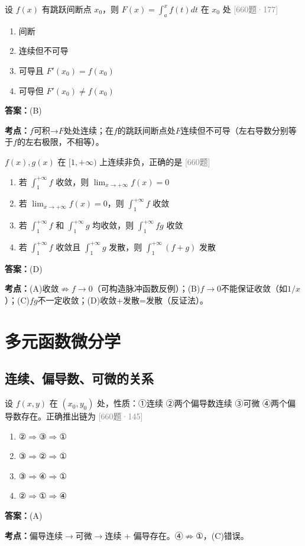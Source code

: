\documentclass[12pt,a4paper]{ctexbook}
\newcommand{\src}[1]{\hfill\textcolor{gray}{\small\textsf{[#1]}}}
\newcommand{\ans}[1]{\begin{answerbox}\textbf{答案：}#1\end{answerbox}}
\newcommand{\kpt}[1]{\textbf{考点：}#1}
\begin{document}
\bigskip

\begin{exercise}[660题·变上限积分性质·177]
设 $f(x)$ 有跳跃间断点 $x_0$，则 $F(x)=\int_a^x f(t)dt$ 在 $x_0$ 处 \hfill\src{660题·177}
\begin{enumerate}[label=(\Alph*),nosep]
  \item 间断
  \item 连续但不可导
  \item 可导且 $F'(x_0)=f(x_0)$
  \item 可导但 $F'(x_0)\neq f(x_0)$
\end{enumerate}
\end{exercise}
\ans{(B)}
\kpt{$f$可积→$F$处处连续；在$f$的跳跃间断点处$F$连续但不可导（左右导数分别等于$f$的左右极限，不相等）。}

\bigskip

\begin{exercise}[660题·反常积分敛散性命题]
$f(x),g(x)$ 在 $[1,+\infty)$ 上连续非负，正确的是 \hfill\src{660题}
\begin{enumerate}[label=(\Alph*),nosep]
  \item 若 $\int_1^{+\infty}f$ 收敛，则 $\lim_{x\to+\infty}f(x)=0$
  \item 若 $\lim_{x\to+\infty}f(x)=0$，则 $\int_1^{+\infty}f$ 收敛
  \item 若 $\int_1^{+\infty}f$ 和 $\int_1^{+\infty}g$ 均收敛，则 $\int_1^{+\infty}fg$ 收敛
  \item 若 $\int_1^{+\infty}f$ 收敛且 $\int_1^{+\infty}g$ 发散，则 $\int_1^{+\infty}(f+g)$ 发散
\end{enumerate}
\end{exercise}
\ans{(D)}
\kpt{(A)收敛$\not\Rightarrow$$f\to 0$（可构造脉冲函数反例）；(B)$f\to 0$不能保证收敛（如$1/x$）；(C)$fg$不一定收敛；(D)收敛+发散=发散（反证法）。}

\newpage

\chapter{多元函数微分学}

\section{连续、偏导数、可微的关系}

\begin{exercise}[660题·多元性质关系图]
设 $f(x,y)$ 在 $(x_0,y_0)$ 处，性质：①连续 ②两个偏导数连续 ③可微 ④两个偏导数存在。正确推出链为 \hfill\src{660题·145}
\begin{enumerate}[label=(\Alph*),nosep]
  \item ②$\Rightarrow$③$\Rightarrow$①
  \item ③$\Rightarrow$②$\Rightarrow$①
  \item ③$\Rightarrow$④$\Rightarrow$①
  \item ②$\Rightarrow$①$\Rightarrow$④
\end{enumerate}
\end{exercise}
\ans{(A)}
\kpt{偏导连续$\to$可微$\to$连续 + 偏导存在。④$\not\Rightarrow$①，(C)错误。}
\end{document}
